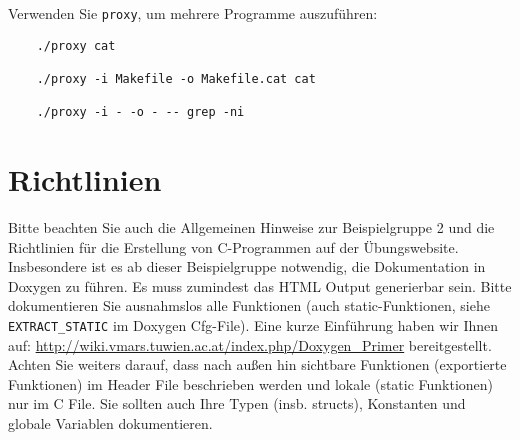 \documentclass{article}
\begin{document}
Verwenden Sie \verb_proxy_, um mehrere Programme auszuführen:

\begin{verbatim}
	./proxy cat
	
	./proxy -i Makefile -o Makefile.cat cat

	./proxy -i - -o - -- grep -ni
\end{verbatim}

\section*{Richtlinien}
Bitte beachten Sie auch die Allgemeinen Hinweise zur Beispielgruppe 2 und die Richtlinien f\"ur die Erstellung von C-Programmen auf der \"Ubungswebsite.
Insbesondere ist es ab dieser Beispielgruppe notwendig, die Dokumentation in Doxygen zu f\"uhren. Es muss zumindest das HTML Output generierbar sein. Bitte dokumentieren Sie ausnahmslos alle Funktionen (auch static-Funktionen, siehe \verb|EXTRACT_STATIC| im Doxygen Cfg-File). Eine kurze Einf\"uhrung haben wir Ihnen auf: \url{http://wiki.vmars.tuwien.ac.at/index.php/Doxygen_Primer} bereitgestellt. Achten Sie weiters darauf, dass nach au{\ss}en hin sichtbare Funktionen (exportierte Funktionen) im Header File beschrieben werden und lokale (static Funktionen) nur im C File. Sie sollten auch Ihre Typen (insb. structs), Konstanten und globale Variablen dokumentieren. 
\end{document}
